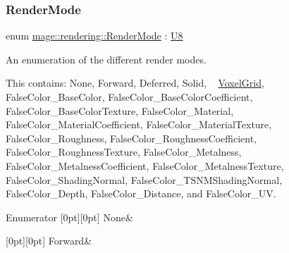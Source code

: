 \subsubsection{\texorpdfstring{Render\+Mode}{RenderMode}}
{\footnotesize\ttfamily enum \mbox{\hyperlink{namespacemage_1_1rendering_aeb14ce7610cc9391f4e01be027b91dcc}{mage\+::rendering\+::\+Render\+Mode}} \+: \mbox{\hyperlink{namespacemage_a30677c03d683c4c35630c25f6ff3fb7f}{U8}}\hspace{0.3cm}{\ttfamily [strong]}}

An enumeration of the different render modes.

This contains\+: {\ttfamily None}, {\ttfamily Forward}, {\ttfamily Deferred}, {\ttfamily Solid}, ~\newline
{\ttfamily \mbox{\hyperlink{classmage_1_1rendering_1_1_voxel_grid}{Voxel\+Grid}}}, {\ttfamily False\+Color\+\_\+\+Base\+Color}, {\ttfamily False\+Color\+\_\+\+Base\+Color\+Coefficient}, {\ttfamily False\+Color\+\_\+\+Base\+Color\+Texture}, {\ttfamily False\+Color\+\_\+\+Material}, {\ttfamily False\+Color\+\_\+\+Material\+Coefficient}, {\ttfamily False\+Color\+\_\+\+Material\+Texture}, {\ttfamily False\+Color\+\_\+\+Roughness}, {\ttfamily False\+Color\+\_\+\+Roughness\+Coefficient}, {\ttfamily False\+Color\+\_\+\+Roughness\+Texture}, {\ttfamily False\+Color\+\_\+\+Metalness}, {\ttfamily False\+Color\+\_\+\+Metalness\+Coefficient}, {\ttfamily False\+Color\+\_\+\+Metalness\+Texture}, {\ttfamily False\+Color\+\_\+\+Shading\+Normal}, {\ttfamily False\+Color\+\_\+\+T\+S\+N\+M\+Shading\+Normal}, {\ttfamily False\+Color\+\_\+\+Depth}, {\ttfamily False\+Color\+\_\+\+Distance}, and {\ttfamily False\+Color\+\_\+\+UV}. \begin{DoxyEnumFields}{Enumerator}
[0pt][0pt]{}\mbox{\label{namespacemage_1_1rendering_aeb14ce7610cc9391f4e01be027b91dcca6adf97f83acf6453d4a6a4b1070f3754}} 
None&\\
\hline

[0pt][0pt]{}\mbox{\label{namespacemage_1_1rendering_aeb14ce7610cc9391f4e01be027b91dcca67d2f6740a8eaebf4d5c6f79be8da481}} 
Forward&\\
\hline


\end{DoxyEnumFields}
